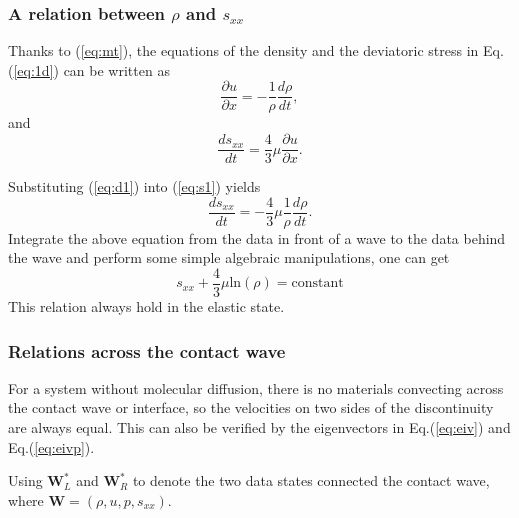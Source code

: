 \documentclass[review]{elsarticle}
\begin{document}
\subsubsection{A relation between $\rho$ and $s_{xx}$ }

Thanks to (\ref{eq:mt}), the equations of the density and the deviatoric stress in Eq.(\ref{eq:1d}) can be written as
  \begin{equation}\label{eq:d1}
    \frac{\partial u}{\partial x} = -\frac{1}{\rho}\frac{d\rho}{dt},
  \end{equation}
  and
  \begin{equation}\label{eq:s1}
    \frac{ds_{xx}}{dt}=\frac{4}{3}\mu\frac{\partial u}{\partial x}.
  \end{equation}

  Substituting (\ref{eq:d1}) into (\ref{eq:s1}) yields
  \begin{equation}
    \frac{ds_{xx}}{dt}=-\frac{4}{3}\mu \frac{1}{\rho}\frac{d\rho}{dt}.
\end{equation}
Integrate the above equation from the data in front of a wave to the data behind the wave and perform some simple algebraic manipulations, one can get
\begin{equation}\label{eq:rhosxx}
  s_{xx}+\frac{4}{3}\mu\text{ln}(\rho) = \text{constant}
\end{equation}
This relation always hold in the elastic state.

\subsubsection{Relations across the contact wave}\label{sec:contacte}
  For  a  system without molecular diffusion, there is no materials convecting  across the contact wave or interface, so the velocities on two sides of  the discontinuity are always equal. %
  This can also be verified by the eigenvectors  in Eq.(\ref{eq:eiv}) and  Eq.(\ref{eq:eivp}).  

Using $\mathbf{W}_L^*$ and $\mathbf{W}_R^*$ to denote the two data states connected the contact wave, where $\mathbf{W}=\left(\rho,u,p,s_{xx}\right)$.
\end{document}
